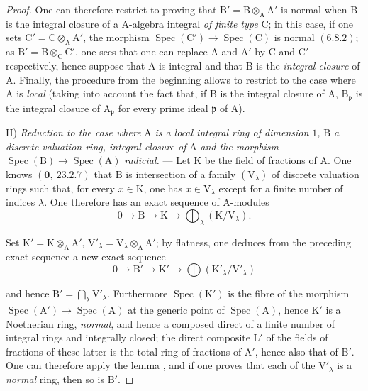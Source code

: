 \begin{proof}
One can therefore restrict to proving that $\mathrm{B}'=\mathrm{B}\otimes_\mathrm{A}\mathrm{A}'$ is normal when $\mathrm{B}$
is the integral closure of a $\mathrm{A}$-algebra integral \emph{of finite type} $\mathrm{C}$; in this case, if one sets
$\mathrm{C}'=\mathrm{C}\otimes_\mathrm{A}\mathrm{A}'$, the morphism $\operatorname{Spec}(\mathrm{C}')\to\operatorname{Spec}(\mathrm{C})$ is normal $(6.8.2)$; as
$\mathrm{B}'=\mathrm{B}\otimes_\mathrm{C}\mathrm{C}'$,
one sees that one can replace $\mathrm{A}$ and $\mathrm{A}'$ by $\mathrm{C}$ and $\mathrm{C}'$ respectively, hence suppose that $\mathrm{A}$
is integral and that $\mathrm{B}$ is the \emph{integral closure} of $\mathrm{A}$. Finally, the procedure from the beginning allows to
restrict to the case where $\mathrm{A}$ is \emph{local} (taking into account the fact that, if $\mathrm{B}$ is the integral closure of $\mathrm{A}$,
$\mathrm{B}_\mathfrak{p}$ is the integral closure of $\mathrm{A}_\mathfrak{p}$ for every prime ideal $\mathfrak{p}$ of $\mathrm{A}$).

II) \emph{Reduction to the case where} $\mathrm{A}$ \emph{is a local integral ring of dimension $1$,} $\mathrm{B}$ \emph{a discrete
valuation ring, integral closure of} $\mathrm{A}$ \emph{and the morphism} $\operatorname{Spec}(\mathrm{B})\to\operatorname{Spec}(\mathrm{A})$ \emph{radicial.} ---
Let $\mathrm{K}$ be the field of fractions of $\mathrm{A}$. One knows $(\mathbf{0},~23.2.7)$ that $\mathrm{B}$ is intersection of a
family $(\mathrm{V}_\lambda)$ of discrete valuation rings such that, for every $x\in\mathrm{K}$, one has $x\in\mathrm{V}_\lambda$
except for a finite number of indices $\lambda$. One therefore has an exact sequence of $\mathrm{A}$-modules
\[
  0\to\mathrm{B}\to\mathrm{K}\to\bigoplus_\lambda(\mathrm{K}/\mathrm{V}_\lambda).
\]

Set $\mathrm{K}'=\mathrm{K}\otimes_\mathrm{A}\mathrm{A}'$, $\mathrm{V}'_\lambda=\mathrm{V}_\lambda\otimes_\mathrm{A}\mathrm{A}'$; by flatness, one deduces from the preceding
exact sequence a new exact sequence
\[
  0\to\mathrm{B}'\to\mathrm{K}'\to\bigoplus(\mathrm{K}'_\lambda/\mathrm{V}'_\lambda)
\]


and hence $\mathrm{B}'=\bigcap_\lambda\mathrm{V}'_\lambda$. Furthermore $\operatorname{Spec}(\mathrm{K}')$ is the fibre of the morphism $\operatorname{Spec}(\mathrm{A}')\to\operatorname{Spec}(\mathrm{A})$
at the generic point of $\operatorname{Spec}(\mathrm{A})$, hence $\mathrm{K}'$ is a Noetherian ring, \emph{normal}, and hence
a composed direct of a finite number of integral rings and integrally closed; the direct composite
$\mathrm{L}'$ of the fields of fractions of these latter is the total ring of fractions of $\mathrm{A}'$,
hence also that of $\mathrm{B}'$. One can therefore apply the lemma , and if one proves
that each of the $\mathrm{V}'_\lambda$ is a \emph{normal} ring, then so is $\mathrm{B}'$.


\end{proof}

